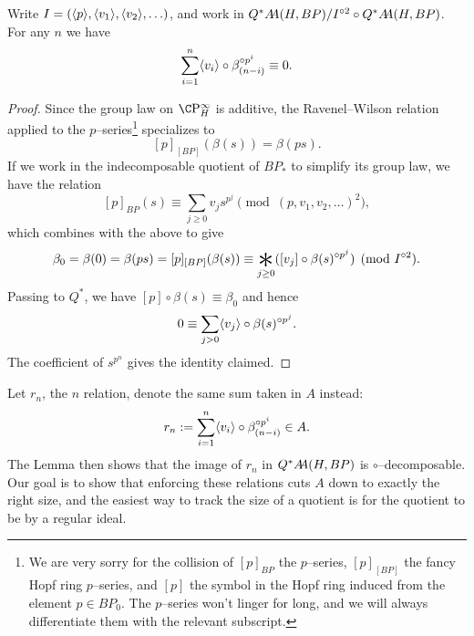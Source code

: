 \begin{lemma}
Write \(I = (\<p\>, \<v_1\>, \<v_2\>, \ldots)\), and work in \(Q^* \AA(H, BP) / I^{\circ 2} \circ Q^* \AA(H, BP)\).  For any \(n\) we have \[\sum_{i=1}^n \<v_i\> \circ \beta_{(n-i)}^{\circ p^i} \equiv 0.\]
\end{lemma}
\begin{proof}
Since the group law on \(\CP^\infty_H\) is additive, the Ravenel--Wilson relation applied to the \(p\)--series\footnote{We are very sorry for the collision of \([p]_{BP}\) the \(p\)--series, \([p]_{[BP]}\) the fancy Hopf ring \(p\)--series, and \([p]\) the symbol in the Hopf ring induced from the element \(p \in BP_0\).  The \(p\)--series won't linger for long, and we will always differentiate them with the relevant subscript.} specializes to \[[p]_{[BP]}(\beta(s)) = \beta(ps).\]  If we work in the indecomposable quotient of \(BP_*\) to simplify its group law, we have the relation \[[p]_{BP}(s) \equiv \sum_{j \ge 0} v_j s^{p^j} \pmod{(p, v_1, v_2, \ldots)^2},\] which combines with the above to give \[\beta_0 = \beta(0) = \beta(ps) = [p]_{[BP]}(\beta(s)) \equiv \bigast_{j \ge 0} ([v_j] \circ \beta(s)^{\circ p^j}) \pmod{I^{\circ 2}}.\]  Passing to \(Q^*\), we have \([p] \circ \beta(s) \equiv \beta_0\) and hence \[0 \equiv \sum_{j > 0} \<v_j\> \circ \beta(s)^{\circ p^j}.\]  The coefficient of \(s^{p^n}\) gives the identity claimed.
\end{proof}

Let \(r_n\), the \(n\){\th} relation, denote the same sum taken in \(A\) instead: \[r_n := \sum_{i=1}^n \<v_i\> \circ \beta_{(n-i)}^{\circ p^i} \in A.\]  The Lemma then shows that the image of \(r_n\) in \(Q^* \AA(H, BP)\) is \(\circ\)--decomposable.  Our goal is to show that enforcing these relations cuts \(A\) down to exactly the right size, and the easiest way to track the size of a quotient is for the quotient to be by a regular ideal.

